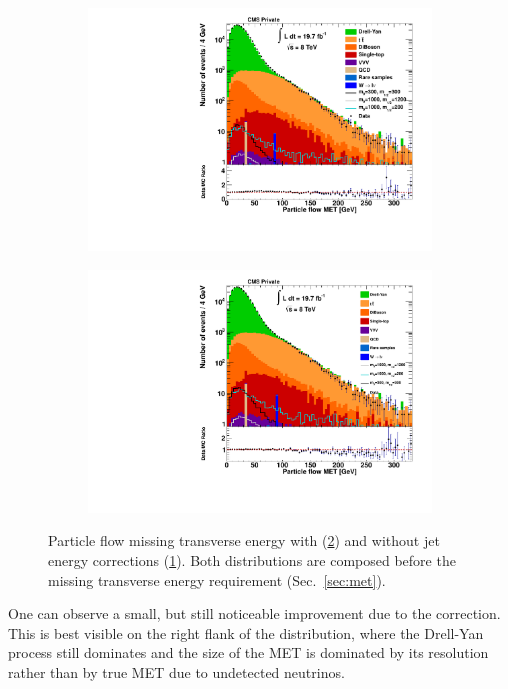\begin{figure}[htb!]
  \centering
  \begin{subfigure}[b]{0.495\textwidth}
    \centering
    \includegraphics[width=\textwidth]{plots/pfmet_nojer.pdf}
    \caption{\label{fig:jerpfmet_nojer}}
  \end{subfigure}
  \begin{subfigure}[b]{0.495\textwidth}
    \centering
    \includegraphics[width=\textwidth]{plots/pfmet.pdf}
    \caption{\label{fig:jerpfmet}}
  \end{subfigure}
  \caption{Particle flow missing transverse energy with (\ref{fig:jerpfmet}) and without jet energy corrections (\ref{fig:jerpfmet_nojer}). Both distributions are composed before the missing transverse energy requirement (Sec.~\ref{sec:met}).}
  \label{fig:jermet}
\end{figure}

\noindent One can observe a small, but still noticeable improvement due to the correction. This is best visible on the right flank of the distribution, where the Drell-Yan process still dominates and the size of the MET is dominated by its resolution rather than by true MET due to undetected neutrinos.


